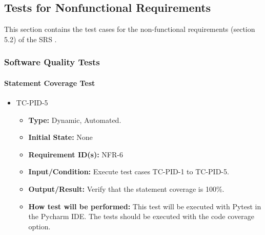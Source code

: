 \documentclass[12pt, titlepage]{article}
\begin{document}
\subsection{Tests for Nonfunctional Requirements}


This section contains the test cases for the non-functional requirements (section
5.2) of the SRS \cite{SRS}.


\subsubsection{Software Quality Tests}
		
\paragraph{Statement Coverage Test}

\begin{itemize}
\item{TC-PID-5\\}
\begin{itemize}

\item{\textbf{Type:}} Dynamic, Automated.
					
\item{\textbf{Initial State:}} None

\item{\textbf{Requirement ID(s):}} NFR-6
					
\item{\textbf{Input/Condition:}}  Execute test cases TC-PID-1 to TC-PID-5.
					
\item{\textbf{Output/Result:}} Verify that the statement coverage is 100\%.

\item{\textbf{How test will be performed:}}  This test will be executed with Pytest \cite{Pytest} in 
the Pycharm \cite{Pycharm} IDE. The tests should be executed with the code coverage 
option. 

\end{itemize}
\end{itemize}
\end{document}

